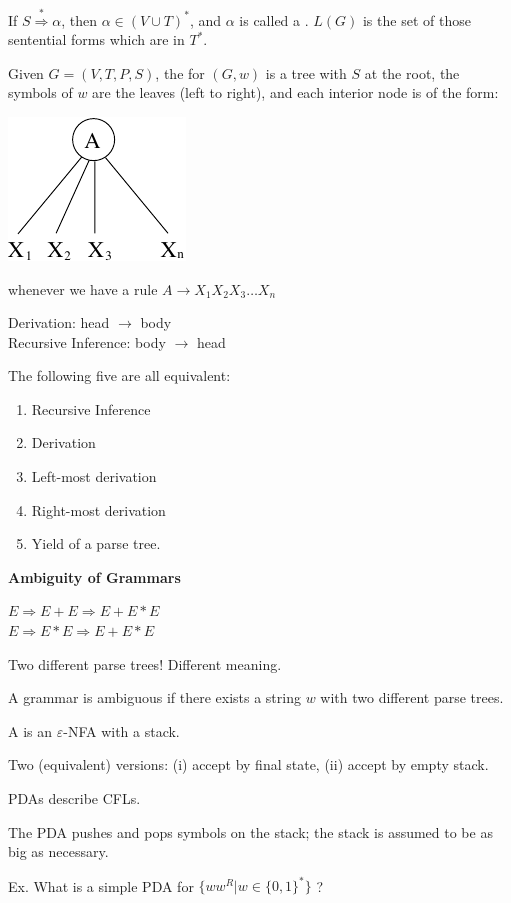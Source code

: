 \begin{frame}

If $S\stackrel{*}{\Rightarrow}\alpha$, then $\alpha\in (V\cup T)^*$,
and $\alpha$ is called a .  
$L(G)$ is the set of those
sentential forms which are in $T^*$.

Given $G=(V,T,P,S)$, the  for $(G,w)$ is a tree with
$S$ at the root, the symbols of $w$ are the leaves (left to right),
and each interior node is of the form:
\begin{center}
\includegraphics{figures/8.pdf}
\end{center}
whenever we have a rule $A\longrightarrow X_1X_2X_3\ldots X_n$
\end{frame}

\begin{frame}
Derivation: head $\longrightarrow$ body \\
Recursive Inference: body $\longrightarrow$ head

The following five are all equivalent:
\begin{enumerate}
\item  Recursive Inference
\item  Derivation
\item  Left-most derivation
\item  Right-most derivation
\item  Yield of a parse tree.
\end{enumerate}
\end{frame}

\begin{frame}

{\bf Ambiguity of Grammars}

$E\Rightarrow E+E\Rightarrow E+E*E$ \\
$E\Rightarrow E*E\Rightarrow E+E*E$

Two different parse trees!  Different meaning.

A grammar is ambiguous if there exists a string $w$ with two different
parse trees.
\end{frame}

\begin{frame}

A  is an $\varepsilon$-NFA with a stack.

Two (equivalent) versions: (i) accept by final state, (ii) accept by
empty stack.

PDAs describe CFLs.

The PDA pushes and pops symbols on the stack; the stack is assumed to
be as big as necessary.

Ex.  What is a simple PDA for $\{ww^R|w\in\{0,1\}^*\}$ ?
\end{frame}

